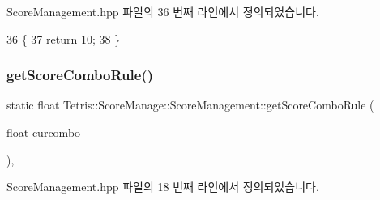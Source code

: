 Score\+Management.\+hpp 파일의 36 번째 라인에서 정의되었습니다.


\begin{DoxyCode}
36                                                                \{
37                     \textcolor{keywordflow}{return} 10;
38                 \}
\end{DoxyCode}
\mbox{\label{class_tetris_1_1_score_manage_1_1_score_management_a41c245dcf773c6c677c2e31f6ac17944}} 
\subsubsection{\texorpdfstring{get\+Score\+Combo\+Rule()}{getScoreComboRule()}}
{\footnotesize\ttfamily static float Tetris\+::\+Score\+Manage\+::\+Score\+Management\+::get\+Score\+Combo\+Rule (\begin{DoxyParamCaption}\item[{float}]{curcombo }\end{DoxyParamCaption})\hspace{0.3cm}{\ttfamily [inline]}, {\ttfamily [static]}}



Score\+Management.\+hpp 파일의 18 번째 라인에서 정의되었습니다.


